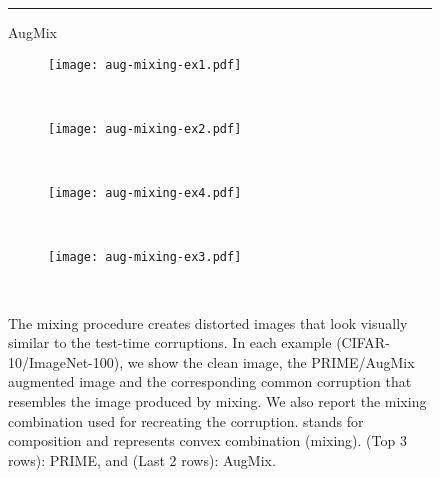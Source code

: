 \documentclass[runningheads]{llncs}
\begin{document}
\begin{figure}[!ht]
    \vspace{3pt}\rule{0.95\columnwidth}{0.4pt}
    \vspace{3pt}
    AugMix
    
    \begin{subfigure}[t]{0.395\columnwidth}
        \centering
        \footnotesize
        \texttt{[image: aug-mixing-ex1.pdf]}
        \captionsetup{justification=centering}
        \vspace*{-4mm}
        \caption{ \\}
        \label{fig:add-mixing-examples:a2} 
    \end{subfigure}
    \begin{subfigure}[t]{0.395\columnwidth}
        \centering
        \footnotesize
        \texttt{[image: aug-mixing-ex2.pdf]}
        \captionsetup{justification=centering}
        \vspace*{-4mm}
        \caption{ \\}
        \label{fig:add-mixing-examples:b2} 
    \end{subfigure}
    \begin{subfigure}[t]{0.395\columnwidth}
        \centering
        \footnotesize
        \texttt{[image: aug-mixing-ex4.pdf]}
        \captionsetup{justification=centering}
        \vspace*{-4mm}
        \caption{\\
        }
        \label{fig:add-mixing-examples:c2}
    \end{subfigure}
    \begin{subfigure}[t]{0.395\columnwidth}
        \centering
        \footnotesize
        \texttt{[image: aug-mixing-ex3.pdf]}
        \captionsetup{justification=centering}
        \vspace*{-4mm}
        \caption{ \\}
        \label{fig:add-mixing-examples:d2} 
    \end{subfigure}
    \caption{The mixing procedure creates distorted images that look visually similar to the test-time corruptions. In each example (CIFAR-10/ImageNet-100), we show the clean image, the PRIME/AugMix augmented image and the corresponding common corruption that resembles the image produced by mixing. We also report the mixing combination used for recreating the corruption.  stands for composition and  represents convex combination (mixing). (Top 3 rows): PRIME, and (Last 2 rows): AugMix.}
    \vspace{-0.8em}
\label{fig:add-mixing-examples}
\end{figure}
\end{document}
